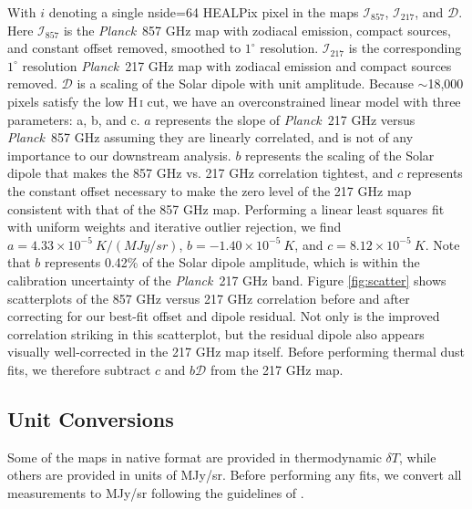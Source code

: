 \documentclass{emulateapj}
\newcommand{\PLANCK}{{\it Planck}}
\begin{document}
With $i$ denoting a single nside=64 HEALPix pixel in the maps 
$\mathcal{I}_{857}$, $\mathcal{I}_{217}$, and $\mathcal{D}$. Here 
$\mathcal{I}_{857}$ is the \PLANCK~857 GHz map with zodiacal emission, compact 
sources, and constant offset removed, smoothed to $1^{\circ}$ resolution. 
$\mathcal{I}_{217}$ is the corresponding $1^{\circ}$ resolution \PLANCK~217 
GHz map with zodiacal emission and compact sources removed. $\mathcal{D}$ is a
scaling of the Solar dipole with unit amplitude. Because $\sim$18,000 pixels
satisfy the low H\,\textsc{i} cut, we have an overconstrained linear model with
three parameters: a, b, and c. $a$ represents the slope of \PLANCK~217 GHz 
versus \PLANCK~857 GHz assuming they are linearly correlated, and is not
of any importance to our downstream analysis. $b$ represents the scaling of 
the Solar dipole that makes the 857 GHz vs. 217 GHz correlation tightest, and 
$c$ represents the constant offset necessary to make the zero level of the 217 
GHz map consistent with that of the 857 GHz map. Performing a linear least
squares fit with uniform weights and iterative outlier rejection, we find 
$a=4.33\times10^{-5}\ K/(MJy/sr)$, $b=-1.40\times10^{-5}\ K$, and 
$c=8.12\times10^{-5}\ K$. Note that $b$ represents 0.42\% of the Solar dipole 
amplitude, which is within the calibration uncertainty of the \PLANCK~217 GHz 
band. Figure \ref{fig:scatter} shows scatterplots of the 857 GHz versus 217 
GHz correlation before and after correcting for our best-fit offset and dipole 
residual. Not only is the improved correlation striking in this scatterplot, 
but the residual dipole also appears visually well-corrected in the 217 GHz 
map itself. Before performing thermal dust fits, we therefore subtract $c$ and 
$b\mathcal{D}$ from the 217 GHz map.

\subsection{Unit Conversions}

Some of the maps in native format are provided in thermodynamic $\delta T$, 
while others are provided in units of MJy/sr. Before performing any fits, 
we convert all measurements to MJy/sr following the guidelines of 
\cite{planckresponse}.

\end{document}
